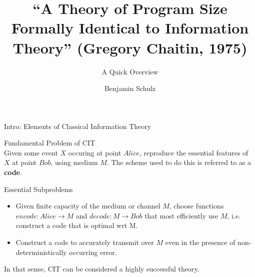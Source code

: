 \documentclass{beamer}
\title{``A Theory of Program Size Formally Identical to Information Theory''
       (Gregory Chaitin, 1975)}
\subtitle{A Quick Overview}
\author{Benjamin Schulz}
\begin{document}
\maketitle{}

\begin{frame}{Intro: Elements of Classical Information Theory}

\begin{structure}{Fundamental Problem of CIT}\\
 Given some event $X$ occuring at point $Alice$, reproduce the essential
 features of $X$ at point $Bob$, using medium $M$.  The scheme used to do
 this is referred to as a \textbf{code}.
\end{structure}

\bigskip

\begin{structure}{Essential Subproblems}\\
 \begin{itemize}
  \item{Given finite capacity of the medium or channel $M$, choose
        functions $encode : Alice \rightarrow M$ and
        $decode : M \rightarrow Bob$ that most efficiently use $M$,
        i.e. construct a code that is optimal wrt M.}
  \item{Construct a code to accurately transmit over $M$ even in the presence of
        non-deterministically occurring error.}
 \end{itemize}
\end{structure}


\color{black}
{In that sense, CIT can be considered a highly successful theory.}

\end{frame}
\end{document}
